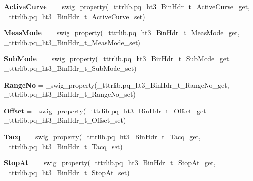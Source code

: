 \begin{DoxyCompactItemize}
{\bfseries Active\+Curve} = \+\_\+swig\+\_\+property(\+\_\+tttrlib.\+pq\+\_\+ht3\+\_\+\+Bin\+Hdr\+\_\+t\+\_\+\+Active\+Curve\+\_\+get, \+\_\+tttrlib.\+pq\+\_\+ht3\+\_\+\+Bin\+Hdr\+\_\+t\+\_\+\+Active\+Curve\+\_\+set)
\item 
\mbox{\label{classtttrlib_1_1pq__ht3___bin_hdr__t_af13b87e9a99a61b382bcb56bed5c92dc}} 
{\bfseries Meas\+Mode} = \+\_\+swig\+\_\+property(\+\_\+tttrlib.\+pq\+\_\+ht3\+\_\+\+Bin\+Hdr\+\_\+t\+\_\+\+Meas\+Mode\+\_\+get, \+\_\+tttrlib.\+pq\+\_\+ht3\+\_\+\+Bin\+Hdr\+\_\+t\+\_\+\+Meas\+Mode\+\_\+set)
\item 
\mbox{\label{classtttrlib_1_1pq__ht3___bin_hdr__t_a84148801d8029de7eabe690a7d6bb144}} 
{\bfseries Sub\+Mode} = \+\_\+swig\+\_\+property(\+\_\+tttrlib.\+pq\+\_\+ht3\+\_\+\+Bin\+Hdr\+\_\+t\+\_\+\+Sub\+Mode\+\_\+get, \+\_\+tttrlib.\+pq\+\_\+ht3\+\_\+\+Bin\+Hdr\+\_\+t\+\_\+\+Sub\+Mode\+\_\+set)
\item 
\mbox{\label{classtttrlib_1_1pq__ht3___bin_hdr__t_ab3e376367d0d58a607cd5cdb82357652}} 
{\bfseries Range\+No} = \+\_\+swig\+\_\+property(\+\_\+tttrlib.\+pq\+\_\+ht3\+\_\+\+Bin\+Hdr\+\_\+t\+\_\+\+Range\+No\+\_\+get, \+\_\+tttrlib.\+pq\+\_\+ht3\+\_\+\+Bin\+Hdr\+\_\+t\+\_\+\+Range\+No\+\_\+set)
\item 
\mbox{\label{classtttrlib_1_1pq__ht3___bin_hdr__t_acde5796631c596d739bb35cd6ae7aea7}} 
{\bfseries Offset} = \+\_\+swig\+\_\+property(\+\_\+tttrlib.\+pq\+\_\+ht3\+\_\+\+Bin\+Hdr\+\_\+t\+\_\+\+Offset\+\_\+get, \+\_\+tttrlib.\+pq\+\_\+ht3\+\_\+\+Bin\+Hdr\+\_\+t\+\_\+\+Offset\+\_\+set)
\item 
\mbox{\label{classtttrlib_1_1pq__ht3___bin_hdr__t_a94693ea5b3c89c69a4cdc2b82da692d0}} 
{\bfseries Tacq} = \+\_\+swig\+\_\+property(\+\_\+tttrlib.\+pq\+\_\+ht3\+\_\+\+Bin\+Hdr\+\_\+t\+\_\+\+Tacq\+\_\+get, \+\_\+tttrlib.\+pq\+\_\+ht3\+\_\+\+Bin\+Hdr\+\_\+t\+\_\+\+Tacq\+\_\+set)
\item 
\mbox{\label{classtttrlib_1_1pq__ht3___bin_hdr__t_ae6c91659a90e03f2919c19b603ab93c0}} 
{\bfseries Stop\+At} = \+\_\+swig\+\_\+property(\+\_\+tttrlib.\+pq\+\_\+ht3\+\_\+\+Bin\+Hdr\+\_\+t\+\_\+\+Stop\+At\+\_\+get, \+\_\+tttrlib.\+pq\+\_\+ht3\+\_\+\+Bin\+Hdr\+\_\+t\+\_\+\+Stop\+At\+\_\+set)

\end{DoxyCompactItemize}
